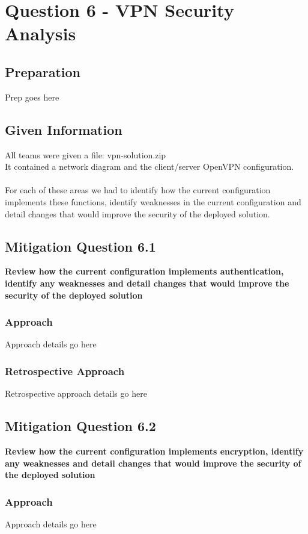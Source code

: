 \chapter{Question 6 - VPN Security Analysis}

\section{Preparation}
Prep goes here

\section{Given Information}
All teams were given a file: vpn-solution.zip\\
It contained a network diagram and the client/server OpenVPN configuration.
\\\\
For each of these areas we had to identify how the current configuration
implements these functions, identify weaknesses in the current configuration and
detail changes that would improve the security of the deployed solution.

\section{Mitigation Question 6.1}
\textbf{Review how the current configuration implements authentication, identify
any weaknesses and detail changes that would improve the security of the
deployed solution}
\subsection{Approach}
Approach details go here
\subsection{Retrospective Approach}
Retrospective approach details go here

\section{Mitigation Question 6.2}
\textbf{Review how the current configuration implements encryption, identify any
weaknesses and detail changes that would improve the security of the deployed
solution}
\subsection{Approach}
Approach details go here
